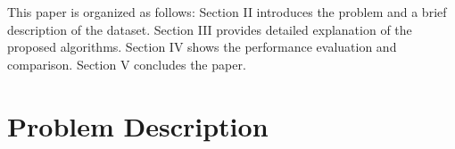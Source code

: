 \documentclass[conference]{IEEEtran}
\begin{document}
This paper is organized as follows: Section II introduces the problem and a brief description of the dataset. Section III provides detailed explanation of the proposed algorithms. Section IV shows the performance evaluation and comparison. Section V concludes the paper. 


 



\section{Problem Description}
\end{document}
